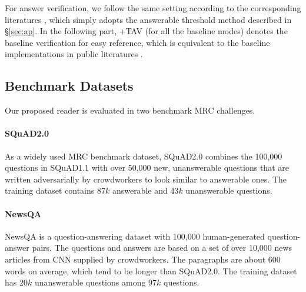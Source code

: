 \documentclass[letterpaper]{article} %
\begin{document}

For answer verification, %
we follow the same setting according to the corresponding literatures \cite{devlin2018bert,Lan2020ALBERT,clark2019electra}, which simply adopts the answerable threshold method described in \S\ref{sec:ap}. In the following part, +TAV (for all the baseline modes) denotes the baseline verification for easy reference, which is equivalent to the baseline implementations in public literatures \cite{devlin2018bert,Lan2020ALBERT,clark2019electra}.

\subsection{Benchmark Datasets}
Our proposed reader is evaluated in two benchmark MRC challenges.
\paragraph{SQuAD2.0}
As a widely used MRC benchmark dataset,
SQuAD2.0  \cite{Rajpurkar2018Know} combines the 100,000 questions in SQuAD1.1 \cite{Rajpurkar2016SQuAD} with over 50,000 new, unanswerable questions that are written adversarially by crowdworkers to look similar to answerable ones.
The training dataset contains 87$k$ answerable and 43$k$ unanswerable questions.

\paragraph{NewsQA}
NewsQA
\cite{trischler2017newsqa} %
is a question-answering dataset with 100,000 human-generated question-answer pairs. The questions and answers are based on a set of over 10,000 news articles from CNN supplied by crowdworkers. The paragraphs are about 600 words on average, which tend to be longer than SQuAD2.0. The training dataset has
20$k$ unanswerable questions among 97$k$ questions.

\end{document}
